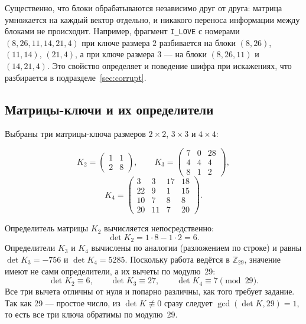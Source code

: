 \documentclass[a4paper,14pt]{extarticle}
\begin{document}
Существенно, что блоки обрабатываются независимо друг от друга: матрица умножается
на каждый вектор отдельно, и никакого переноса информации между блоками не
происходит. Например, фрагмент \texttt{I\_LOVE} с номерами
$(8, 26, 11, 14, 21, 4)$ при ключе размера $2$ разбивается на блоки
$(8, 26)$, $(11, 14)$, $(21, 4)$, а при ключе размера $3$ --- на блоки
$(8, 26, 11)$ и $(14, 21, 4)$. Это свойство определяет и поведение шифра при
искажениях, что разбирается в подразделе~\ref{sec:corrupt}.

\subsection{Матрицы-ключи и их определители}

Выбраны три матрицы-ключа размеров $2\times2$, $3\times3$ и $4\times4$:

\begin{equation}
  K_2 = \begin{pmatrix} 1 & 1 \\ 2 & 8 \end{pmatrix}, \qquad K_3 = \begin{pmatrix} 7 & 0 & 28 \\ 4 & 4 & 4 \\ 8 & 1 & 2 \end{pmatrix},
\end{equation}
\begin{equation}
  K_4 = \begin{pmatrix} 3 & 3 & 17 & 18 \\ 22 & 9 & 1 & 15 \\ 10 & 7 & 8 & 8 \\ 20 & 11 & 7 & 20 \end{pmatrix}.
\end{equation}

Определитель матрицы $K_2$ вычисляется непосредственно:
\begin{equation}
  \det K_2 = 1\cdot 8 - 1\cdot 2 = 6 .
\end{equation}
Определители $K_3$ и $K_4$ вычислены по аналогии (разложением по строке) и равны
$\det K_3 = -756$ и $\det K_4 = 5285$. Поскольку работа ведётся в $\mathbb{Z}_{29}$,
значение имеют не сами определители, а их вычеты по модулю~29:
\begin{equation}
  \det K_2 \equiv 6, \qquad \det K_3 \equiv 27, \qquad \det K_4 \equiv 7 \pmod{29}.
\end{equation}
Все три вычета отличны от нуля и попарно различны, как того требует задание.
Так как 29 --- простое число, из $\det K \not\equiv 0$ сразу следует
$\gcd(\det K, 29) = 1$, то есть все три ключа обратимы по модулю~29.
\end{document}
